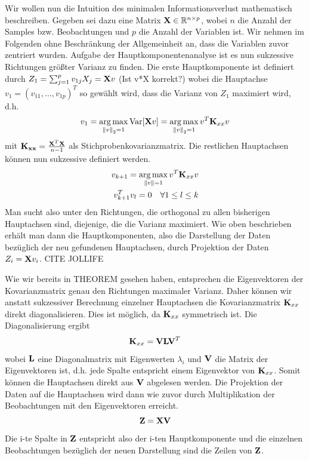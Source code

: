 Wir wollen nun die Intuition des minimalen Informationsverlust mathematisch beschreiben. Gegeben sei dazu eine Matrix $\mathbf{X} \in \mathbb{R}^{n\times p}$, wobei $n$ die Anzahl der Samples bzw. Beobachtungen und $p$ die Anzahl der Variablen ist. Wir nehmen im Folgenden ohne Beschränkung der Allgemeinheit an, dass die Variablen zuvor zentriert wurden. Aufgabe der Hauptkomponentenanalyse ist es nun sukzessive Richtungen größter Varianz zu finden. Die erste Hauptkomponente ist definiert durch $Z_1 = \sum_{j=1}^p v_{1j}X_j = \mathbf{X}v$ (Ist v*X korrekt?) wobei die Hauptachse $v_1 = (v_{11}, \ldots, v_{1p})^T$ so gewählt wird, dass die Varianz von $Z_1$ maximiert wird, d.h.
$$v_1 = \operatorname*{arg\,max}_{\left\lVert v \right\rVert_2 = 1} \text{Var}[\mathbf{X}v] = \operatorname*{arg\,max}_{\left\lVert v \right\rVert_2 = 1} v^T \mathbf{K}_{xx} v$$
mit $\mathbf{K_{xx}} = \frac{\mathbf{X}^T\mathbf{X}}{n-1}$ als Stichprobenkovarianzmatrix. Die restlichen Hauptachsen können nun sukzessive definiert werden.
\begin{align}
\label{pca_variance_maximization}
\begin{split}
v_{k+1} = \operatorname*{arg\,max}_{\left\lVert v \right\rVert = 1} v^T \mathbf{K}_{xx} v\\
v_{k+1}^Tv_l = 0 \quad \forall 1 \leq l \leq k
\end{split}
\end{align}
Man sucht also unter den Richtungen, die orthogonal zu allen bisherigen Hauptachsen sind, diejenige, die die Varianz maximiert. Wie oben beschrieben erhält man dann die Hauptkomponenten, also die Darstellung der Daten bezüglich der neu gefundenen Hauptachsen, durch Projektion der Daten $Z_i = \mathbf{X}v_i$.
\cite{zou_overview}
CITE JOLLIFE

Wie wir bereits in THEOREM gesehen haben, entsprechen die Eigenvektoren der Kovarianzmatrix genau den Richtungen maximaler Varianz. Daher können wir anstatt sukzessiver Berechnung einzelner Hauptachsen die Kovarianzmatrix $\mathbf{K}_{xx}$ direkt diagonalisieren. Dies ist möglich, da $\mathbf{K}_{xx}$ symmetrisch ist. Die Diagonalisierung ergibt
$$\mathbf{K}_{xx} = \mathbf{V} \mathbf{L} \mathbf{V}^T$$
wobei $\mathbf{L}$ eine Diagonalmatrix mit Eigenwerten $\lambda_i$ und $\mathbf{V}$ die Matrix der Eigenvektoren ist, d.h. jede Spalte entspricht einem Eigenvektor von $\mathbf{K}_{xx}$. Somit können die Hauptachsen direkt aus $\mathbf{V}$ abgelesen werden. Die Projektion der Daten auf die Hauptachsen wird dann wie zuvor durch Multiplikation der Beobachtungen mit den Eigenvektoren erreicht. 
$$\mathbf{Z} = \mathbf{X} \mathbf{V}$$
Die i-te Spalte in $\mathbf{Z}$ entspricht also der i-ten Hauptkomponente und die einzelnen Beobachtungen bezüglich der neuen Darstellung sind die Zeilen von $\mathbf{Z}$.


